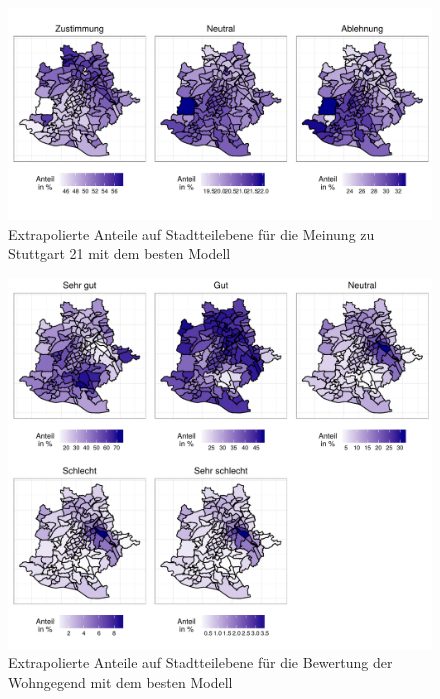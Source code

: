 \documentclass{Vorlage}
\begin{document}
\begin{appendix}

\begin{figure}[h]
 \begin{center}
 \includegraphics[scale=0.8]{Pictures/S21Extra}
 \caption{Extrapolierte Anteile auf Stadtteilebene für die Meinung zu Stuttgart 21 mit dem besten Modell}
 \label{S21Extra}
 \end{center}
\end{figure}

\begin{figure}[h]
 \begin{center}
 \includegraphics[scale=0.8]{Pictures/BWohnExtra}
 \caption{Extrapolierte Anteile auf Stadtteilebene für die Bewertung der Wohngegend mit dem besten Modell}
 \label{WohnExtra}
 \end{center}
\end{figure}

\end{appendix}
\clearpage
\pagestyle{plain}
\end{document}
